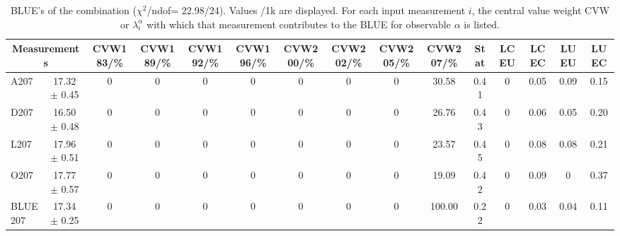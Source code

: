 \begin{table}[H]
\scriptsize
\begin{center}
\renewcommand{\arraystretch}{1.1}
\begin{tabular}{|lc|c|c|c|c|c|c|c|c|ccccc|}
\hline
\multicolumn{2}{|c|}{Measurements} & CVW{\tiny 183}/\%  & CVW{\tiny 189}/\%  & CVW{\tiny 192}/\%  & CVW{\tiny 196}/\%  & CVW{\tiny 200}/\%  & CVW{\tiny 202}/\%  & CVW{\tiny 205}/\%  & CVW{\tiny 207}/\%  & {\tiny Stat} & {\tiny LCEU} & {\tiny LCEC} & {\tiny LUEU} & {\tiny LUEC}\\
\hline
A207 &      17.32 $\pm$       0.45 &  0 &  0 &  0 &  0 &  0 &  0 &  0 &      30.58 &       0.41 &  0 &       0.05 &       0.09 &       0.15\\
D207 &      16.50 $\pm$       0.48 &  0 &  0 &  0 &  0 &  0 &  0 &  0 &      26.76 &       0.43 &  0 &       0.06 &       0.05 &       0.20\\
L207 &      17.96 $\pm$       0.51 &  0 &  0 &  0 &  0 &  0 &  0 &  0 &      23.57 &       0.45 &  0 &       0.08 &       0.08 &       0.21\\
O207 &      17.77 $\pm$       0.57 &  0 &  0 &  0 &  0 &  0 &  0 &  0 &      19.09 &       0.42 &  0 &       0.09 &  0 &       0.37\\
\hline
BLUE {\tiny 207} &      17.34 $\pm$       0.25 &  0 &  0 &  0 &  0 &  0 &  0 &  0 &     100.00 &       0.22 &  0 &       0.03 &       0.04 &       0.11\\
\hline
\end{tabular}
\caption{BLUE's of the combination ($\chi^2$/ndof=     22.98/24).
 Values /1k are displayed. For each input measurement $i$, the central value weight CVW or $\lambda_i^\alpha$ with which that measurement contributes to the BLUE for observable $\alpha$ is listed.}
\renewcommand{\arraystretch}{1}
\end{center}
\end{table}
